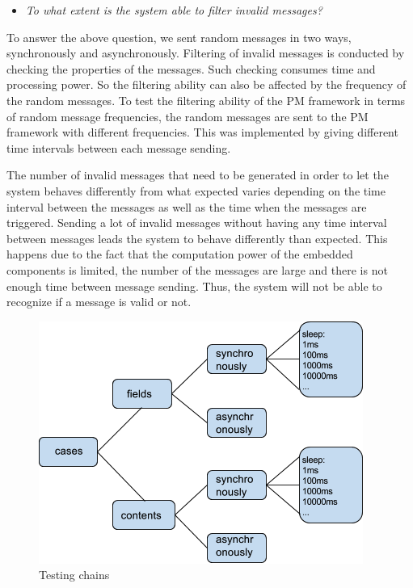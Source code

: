  \begin{itemize}
 \item {\em To what extent is the system able to filter invalid messages?} 
 \end{itemize}
 
 To answer the above question, we sent random messages in two ways, synchronously and asynchronously.
Filtering of invalid messages is conducted by checking the properties of the messages. Such checking consumes time and processing power. So the filtering ability can also be affected by the frequency of the random messages. To test the filtering ability of the PM framework in terms of random message frequencies, the random messages are sent to the PM framework with different frequencies. This was implemented by giving different time intervals between each message sending. 

The number of invalid messages that need to be generated in order to let the system behaves differently from what expected varies depending on the time interval between the messages as well as the time when the messages are triggered. Sending a lot of invalid messages without having any time interval between messages leads the system to behave differently than expected. This happens due to the fact that the computation power of the embedded components is limited, the number of the messages are large and there is not enough time between message sending. Thus, the system will not be able to recognize if a message is valid or not. 

\begin{figure}[h!]
\centering
\includegraphics[width=.8\columnwidth]{figure/testingchain.png}
\caption{Testing chains \label{testingchain}}
\end{figure}

